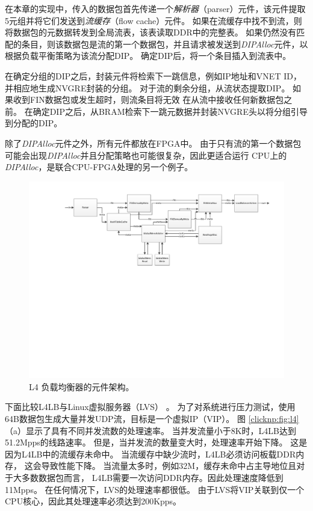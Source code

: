 在本章的实现中，传入的数据包首先传递一个\textit {解析器}（parser）元件，该元件提取5元组并将它们发送到\textit {流缓存}（flow cache）元件。
如果在流缓存中找不到流，则将数据包的元数据转发到全局流表，该表读取DDR中的完整表。
如果仍然没有匹配的条目，则该数据包是流的第一个数据包，并且请求被发送到\textit {DIPAlloc}元件，以根据负载平衡策略为该流分配DIP。
确定DIP后，将一个条目插入到流表中。

在确定分组的DIP之后，封装元件将检索下一跳信息，例如IP地址和VNET ID，并相应地生成NVGRE封装的分组。
对于流的剩余分组，从流状态提取DIP。
如果收到FIN数据包或发生超时，则流条目将无效
在从流中接收任何新数据包之前。
在确定DIP之后，从BRAM检索下一跳元数据并封装NVGRE头以将分组引导到分配的DIP。

除了\textit {DIPAlloc}元件之外，所有元件都放在FPGA中。
由于只有流的第一个数据包可能会出现\textit {DIPAlloc}并且分配策略也可能很复杂，因此更适合运行
CPU上的\textit {DIPAlloc}，是联合CPU-FPGA处理的另一个例子。


\begin{figure}[htbp]
	\centering
	\includegraphics[width=1.0\textwidth]{image/L4LoadBalance}
	\caption{L4 负载均衡器的元件架构。}
	\label{clicknp:fig:L4LB}
\end{figure}


下面比较L4LB与Linux虚拟服务器（LVS） \cite {lvs}。
为了对系统进行压力测试，使用64B数据包生成大量并发UDP流，目标是一个虚拟IP（VIP）。
图 \ref {clicknp:fig:l4}（a）显示了具有不同并发流数的处理速率。
当并发流量小于8K时，L4LB达到51.2Mpps的线路速率。
但是，当并发流的数量变大时，处理速率开始下降。
这是因为L4LB中的流缓存未命中。
当流缓存中缺少流时，L4LB必须访问板载DDR内存，
这会导致性能下降。
当流量太多时，例如32M，缓存未命中占主导地位且对于大多数数据包而言，
L4LB需要一次访问DDR内存。因此处理速度降低到11Mpps。
在任何情况下，LVS的处理速率都很低。
由于LVS将VIP关联到仅一个CPU核心，因此其处理速率必须达到200Kpps。

